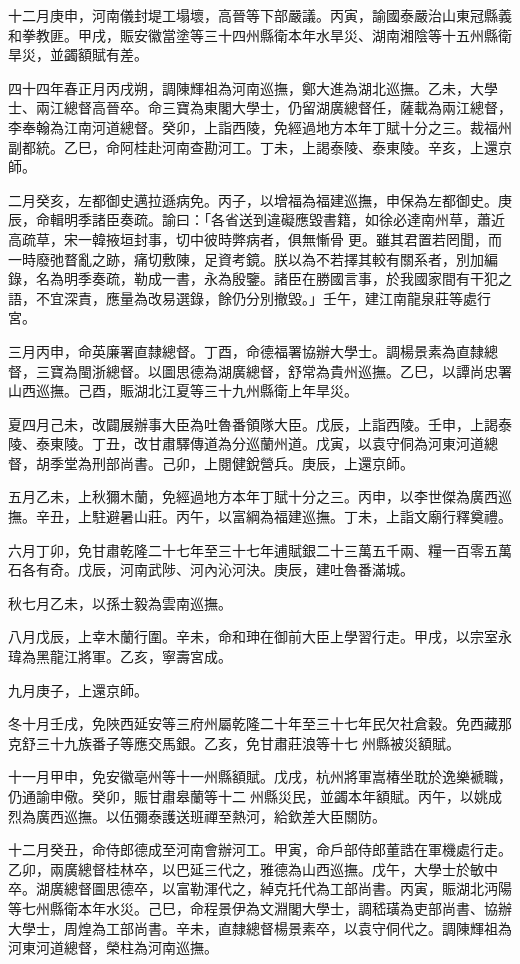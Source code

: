 \begin{pinyinscope}
十二月庚申，河南儀封堤工塌壞，高晉等下部嚴議。丙寅，諭國泰嚴治山東冠縣義和拳教匪。甲戌，賑安徽當塗等三十四州縣衛本年水旱災、湖南湘陰等十五州縣衛旱災，並蠲額賦有差。

四十四年春正月丙戌朔，調陳輝祖為河南巡撫，鄭大進為湖北巡撫。乙未，大學士、兩江總督高晉卒。命三寶為東閣大學士，仍留湖廣總督任，薩載為兩江總督，李奉翰為江南河道總督。癸卯，上詣西陵，免經過地方本年丁賦十分之三。裁福州副都統。乙巳，命阿桂赴河南查勘河工。丁未，上謁泰陵、泰東陵。辛亥，上還京師。

二月癸亥，左都御史邁拉遜病免。丙子，以增福為福建巡撫，申保為左都御史。庚辰，命輯明季諸臣奏疏。諭曰：「各省送到違礙應毀書籍，如徐必達南州草，蕭近高疏草，宋一韓掖垣封事，切中彼時弊病者，俱無慚骨更。雖其君置若罔聞，而一時廢弛瞀亂之跡，痛切敷陳，足資考鏡。朕以為不若擇其較有關系者，別加編錄，名為明季奏疏，勒成一書，永為殷鑒。諸臣在勝國言事，於我國家間有干犯之語，不宜深責，應量為改易選錄，餘仍分別撤毀。」壬午，建江南龍泉莊等處行宮。

三月丙申，命英廉署直隸總督。丁酉，命德福署協辦大學士。調楊景素為直隸總督，三寶為閩浙總督。以圖思德為湖廣總督，舒常為貴州巡撫。乙巳，以譚尚忠署山西巡撫。己酉，賑湖北江夏等三十九州縣衛上年旱災。

夏四月己未，改闢展辦事大臣為吐魯番領隊大臣。戊辰，上詣西陵。壬申，上謁泰陵、泰東陵。丁丑，改甘肅驛傳道為分巡蘭州道。戊寅，以袁守侗為河東河道總督，胡季堂為刑部尚書。己卯，上閱健銳營兵。庚辰，上還京師。

五月乙未，上秋獮木蘭，免經過地方本年丁賦十分之三。丙申，以李世傑為廣西巡撫。辛丑，上駐避暑山莊。丙午，以富綱為福建巡撫。丁未，上詣文廟行釋奠禮。

六月丁卯，免甘肅乾隆二十七年至三十七年逋賦銀二十三萬五千兩、糧一百零五萬石各有奇。戊辰，河南武陟、河內沁河決。庚辰，建吐魯番滿城。

秋七月乙未，以孫士毅為雲南巡撫。

八月戊辰，上幸木蘭行圍。辛未，命和珅在御前大臣上學習行走。甲戌，以宗室永瑋為黑龍江將軍。乙亥，寧壽宮成。

九月庚子，上還京師。

冬十月壬戌，免陜西延安等三府州屬乾隆二十年至三十七年民欠社倉穀。免西藏那克舒三十九族番子等應交馬銀。乙亥，免甘肅莊浪等十七州縣被災額賦。

十一月甲申，免安徽亳州等十一州縣額賦。戊戌，杭州將軍嵩椿坐耽於逸樂褫職，仍通諭申儆。癸卯，賑甘肅皋蘭等十二州縣災民，並蠲本年額賦。丙午，以姚成烈為廣西巡撫。以伍彌泰護送班禪至熱河，給欽差大臣關防。

十二月癸丑，命侍郎德成至河南會辦河工。甲寅，命戶部侍郎董誥在軍機處行走。乙卯，兩廣總督桂林卒，以巴延三代之，雅德為山西巡撫。戊午，大學士於敏中卒。湖廣總督圖思德卒，以富勒渾代之，綽克托代為工部尚書。丙寅，賑湖北沔陽等七州縣衛本年水災。己巳，命程景伊為文淵閣大學士，調嵇璜為吏部尚書、協辦大學士，周煌為工部尚書。辛未，直隸總督楊景素卒，以袁守侗代之。調陳輝祖為河東河道總督，榮柱為河南巡撫。


\end{pinyinscope}
